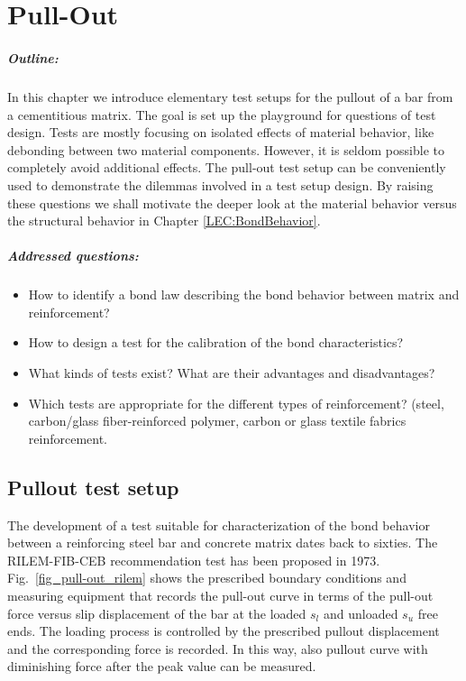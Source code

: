 \documentclass[main.tex]{subfiles}
\begin{document}
\chapter{Pull-Out}
\label{LEC:PullOut}

\paragraph{Outline:}
In this chapter we introduce elementary test setups for the pullout of a bar from a cementitious matrix.
The goal is set up the playground for questions of test design. Tests are mostly focusing on isolated
effects of material behavior, like debonding between two material components. However, it is seldom possible
to completely avoid additional effects. The pull-out test setup can be conveniently used to demonstrate 
the dilemmas involved in a test setup design. By raising these questions we shall motivate the 
deeper look at the material behavior versus the structural behavior in Chapter \ref{LEC:BondBehavior}.

\paragraph{Addressed questions:}
\begin{itemize}
\item 
How to identify a bond law describing the bond behavior between matrix and reinforcement? 
\item How to design a test for the calibration of the bond characteristics? 
\item What kinds of tests exist? What are their advantages and disadvantages?
\item Which tests are appropriate for the different types of reinforcement? (steel, carbon/glass fiber-reinforced polymer,
carbon or glass textile fabrics reinforcement. 
\end{itemize}

\section{Pullout test setup}
\label{Pullout_test_setup}

The development of a test suitable for characterization of the bond behavior between a reinforcing steel bar and concrete matrix dates back to sixties. The RILEM-FIB-CEB recommendation test has been proposed in 1973. Fig.~\ref{fig_pull-out_rilem} shows the prescribed boundary conditions and measuring equipment that records the pull-out curve in terms of the pull-out force versus slip displacement of the bar at the loaded $s_l$ and unloaded $s_u$ free ends. The loading process is controlled by the prescribed pullout displacement and the corresponding force is recorded. In this way, also pullout curve with diminishing force after the peak value can be measured.
\end{document}
